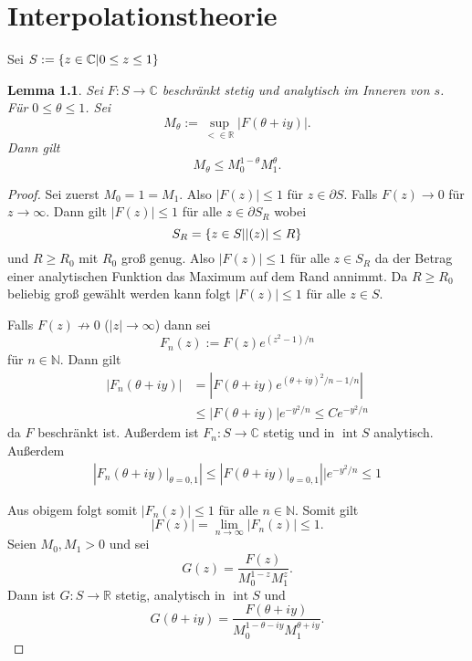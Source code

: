 \documentclass[
paper=a4,
bibtotocnumbered,
liststotocnumbered,
tablecaptionabove,
pointlessnumbers,
twoside,
openright,
10pt
]
{report}
\let\Re\relax\let\Im\relax
\DeclareMathOperator{\Re}{Re}
\DeclareMathOperator{\Im}{Im}
\newtheorem{lem}[thm]{Lemma}
\theoremstyle{definition}
\numberwithin{equation}{chapter}
\begin{document}
\chapter{Interpolationstheorie}
Sei $S:=\{z\in \mathbb C|0\le \Re z \le 1\}$
\begin{lem}\label{lem 8.1}
Sei $F:S\to \mathbb C$ beschränkt stetig und analytisch im Inneren von $s$. Für $0\le \theta\le 1$. Sei 
\begin{equation}
M_\theta:= \sup_{<\in \mathbb R} |F(\theta+iy)|.
\end{equation}
Dann gilt
\begin{equation}
M_\theta \le M_0^{1-\theta} M_1^\theta.
\end{equation}
\end{lem}

\begin{proof}
Sei zuerst $M_0=1=M_1$. Also $|F(z)|\le 1$ für $z\in \partial S$. Falls $F(z)\to 0$ für $z\to \infty$. Dann gilt $|F(z)|\le 1$ für alle $z\in \partial S_R$ wobei
\begin{equation}
S_R = \{z\in S| |\Im(z)|\le R\}
\end{equation} 
und $R\ge R_0$ mit $R_0$ groß genug. Also $|F(z)|\le 1$ für alle $z\in S_R$ da der Betrag einer analytischen Funktion das Maximum auf dem Rand annimmt. Da $R\ge R_0$ beliebig groß gewählt werden kann folgt $|F(z)|\le 1$ für alle $z\in S$.

Falls $F(z)\not \to 0$ ($|z|\to \infty$) dann sei
\begin{equation}
F_n(z):= F(z) e^{(z^2-1)/n}
\end{equation}
für $n\in \mathbb N$. Dann gilt
\begin{align}
|F_n(\theta + i y)| &= \left | F(\theta + i y) e^{(\theta+iy)^2/n -1/n} \right |\\
&\le | F(\theta + iy) | e^{-y^2/n} \le C e^{-y^2/n}
\end{align}
da $F$ beschränkt ist.  Außerdem ist $F_n: S\to \mathbb C$ stetig und in $\operatorname{int} S$ analytisch. Außerdem
\begin{align}
\left|F_n(\theta + iy)\big| _{\theta=0,1}\right| \le | F(\theta +iy)\big |_{\theta=0,1} || e^{-y^2/n} \le 1
\end{align}

Aus obigem folgt somit $|F_n(z)|\le 1$ für alle $n\in \mathbb N$. Somit gilt
\begin{equation}
|F(z)|=\lim_{n\to \infty} |F_n(z)|\le 1.
\end{equation}
Seien $M_0, M_1>0$ und sei
\begin{equation}
G(z) = \frac{F(z)}{M_0^{1-z} M_1^z}.
\end{equation}
Dann ist $G: S\to \mathbb R$ stetig, analytisch in $\operatorname{int} S$ und
\begin{equation}
G(\theta +iy) = \frac{F(\theta +iy)}{M_0^{1-\theta-iy} M_1^{\theta+iy}}.
\end{equation} 


\end{proof}
\end{document}
